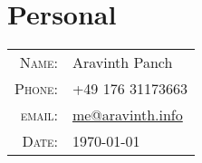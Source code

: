 \section{Personal}
\begin{tabular}
	{rl}
	\textsc{Name:} &  Aravinth Panch \\
	\textsc{Phone:} & +49 176 31173663\\
	\textsc{email:} & \href{mailto:me@aravinth.info}{me@aravinth.info} \\
	\textsc{Date:} & \today\\
\end{tabular}
